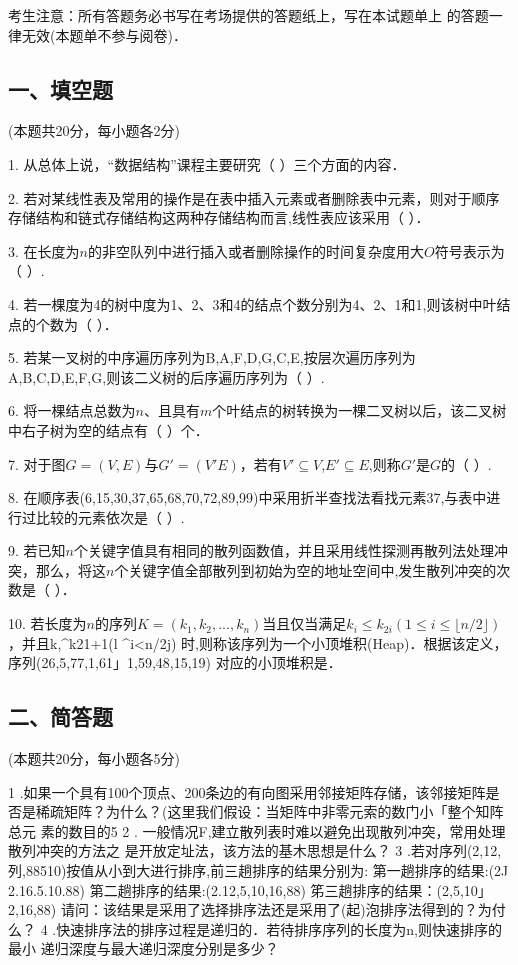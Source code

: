 

考生注意：所有答题务必书写在考场提供的答题纸上，写在本试题单上 的答题一律无效(本题单不参与阅卷)．

\subsection{一、填空题}
(本题共20分，每小题各2分)

1. 从总体上说，“数据结构”课程主要研究（    ）三个方面的内容．

2. 若对某线性表及常用的操作是在表中插入元素或者删除表中元素，则对于顺序存储结构和链式存储结构这两种存储结构而言,线性表应该采用（    ）．

3. 在长度为$n$的非空队列中进行插入或者删除操作的时间复杂度用大$O$符号表示为（    ）.

4. 若一棵度为4的树中度为1、2、3和4的结点个数分别为4、2、1和1,则该树中叶结点的个数为（    ）．

5. 若某一叉树的中序遍历序列为B,A,F,D,G,C,E,按层次遍历序列为A,B,C,D,E,F,G,则该二义树的后序遍历序列为（    ）.

6. 将一棵结点总数为$n$、且具有$m$个叶结点的树转换为一棵二叉树以后，该二叉树中右子树为空的结点有（    ）个．

7. 对于图$G=(V,E)$与$G'=(V'E)$，若有$V'\subseteq V$,$E'\subseteq E$,则称$G'$是$G$的（    ）.

8. 在顺序表(6,15,30,37,65,68,70,72,89,99)中采用折半查找法看找元素37,与表中进行过比较的元素依次是（    ）.

9. 若已知$n$个关键字值具有相同的散列函数值，并且采用线性探测再散列法处理冲突，那么，将这$n$个关键字值全部散列到初始为空的地址空间中,发生散列冲突的次数是（    ）．

10. 若长度为$n$的序列$K=(k_1,k_2,...,k_n)$当且仅当满足$k_i\leqslant k_{2i}(1\leqslant i\leqslant \lfloor n/2 \rfloor)$，并且k,^k21+1(l ^i<n/2j) 时,则称该序列为一个小顶堆积(Heap)．根据该定义，序列(26,5,77,1,61」1,59,48,15,19) 对应的小顶堆积是．

\subsection{二、简答题}
(本题共20分，每小题各5分)

1	.如果一个具有100个顶点、200条边的有向图采用邻接矩阵存储，该邻接矩阵是 否是稀疏矩阵？为什么？(这里我们假设：当矩阵中非零元索的数门小「整个知阵总元 素的数目的5%
2	. 一般情况F,建立散列表时难以避免出现散列冲突，常用处理散列冲突的方法之 是开放定址法，该方法的基木思想是什么？
3	.若对序列(2,12,列,88510)按值从小到大进行排序,前三趟排序的结果分别为:
第一趟排序的结果:(2J 2.16.5.10.88)
第二趟排序的结果:(2.12,5,10,16,88)
笫三趟排序的结果：(2,5,10」2,16,88)
请问：该结果是采用了选择排序法还是采用了(起)泡排序法得到的？为付么？
4	.快速排序法的排序过程是递归的．若待排序序列的长度为n,则快速排序的最小 递归深度与最大递归深度分别是多少？

